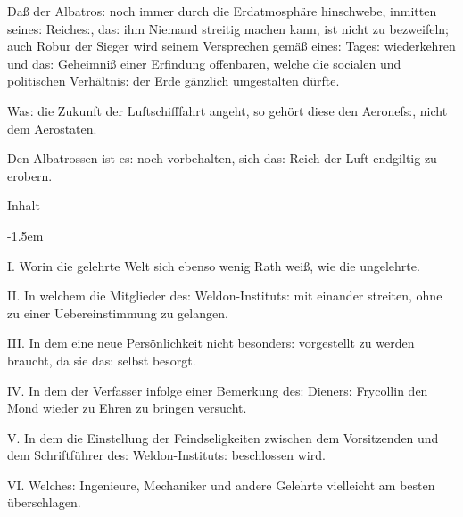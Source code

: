 \documentclass[oneside,12pt]{book}
\newenvironment{antiqua}{\normalfont}{}
\newcommand{\s}{s:}
\begin{document}
Da{\ss} der {\glqq}Albatro{\s}{\grqq} noch immer durch die
Erdatmosph\"are hinschwebe, inmitten seine{\s} Reiche{\s}, da{\s} ihm
Niemand streitig machen kann, ist nicht zu bezweifeln; auch Robur der
Sieger wird seinem Versprechen gem\"a{\ss} eine{\s} Tage{\s}
wiederkehren und da{\s} Geheimni{\ss} einer Erfindung offenbaren,
welche die socialen und politischen Verh\"altni{\s} der Erde
g\"anzlich umgestalten d\"urfte.

Wa{\s} die Zukunft der Luftschifffahrt angeht, so geh\"ort diese den
Aeronef{\s}, nicht dem Aerostaten.

Den {\glqq}Albatrossen{\grqq} ist e{\s} noch vorbehalten, sich da{\s}
Reich der Luft endgiltig zu erobern.


\newpage\begin{center}
Inhalt
\end{center}

\parindent-1.5em

\begin{antiqua}I.\end{antiqua} Worin die gelehrte Welt sich ebenso
wenig Rath wei{\ss}, wie die ungelehrte.~\dotfill\pageref{kap01}

\begin{antiqua}II.\end{antiqua} In welchem die Mitglieder de{\s}
Weldon-Institut{\s} mit einander streiten, ohne zu einer
Uebereinstimmung zu gelangen.~\dotfill\pageref{kap02}

\begin{antiqua}III.\end{antiqua} In dem eine neue Pers\"onlichkeit
nicht besonder{\s} vorgestellt zu werden braucht, da sie da{\s}
selbst besorgt.~\dotfill\pageref{kap03}

\begin{antiqua}IV.\end{antiqua} In dem der Verfasser infolge einer
Bemerkung de{\s} Diener{\s} Frycollin den Mond wieder zu Ehren zu
bringen versucht.~\dotfill\pageref{kap04}

\begin{antiqua}V.\end{antiqua} In dem die Einstellung der
Feindseligkeiten zwischen dem Vorsitzenden und dem Schriftf\"uhrer
de{\s} Weldon-Institut{\s} beschlossen wird.~\dotfill\pageref{kap05}

\begin{antiqua}VI.\end{antiqua} Welche{\s} Ingenieure, Mechaniker und
andere Gelehrte vielleicht am besten
\"uberschlagen.~\dotfill\pageref{kap06}
\end{document}
